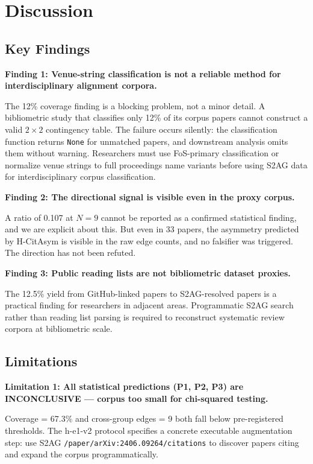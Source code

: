 \section{Discussion}
\label{sec:discussion}

\subsection{Key Findings}

\textbf{Finding 1: Venue-string classification is not a reliable method for interdisciplinary alignment corpora.}

The 12\% coverage finding is a blocking problem, not a minor detail.
A bibliometric study that classifies only 12\% of its corpus papers cannot construct a valid $2\times2$ contingency table.
The failure occurs silently: the classification function returns \texttt{None} for unmatched papers, and downstream analysis omits them without warning.
Researchers must use FoS-primary classification or normalize venue strings to full proceedings name variants before using S2AG data for interdisciplinary corpus classification.

\textbf{Finding 2: The directional signal is visible even in the proxy corpus.}

A ratio of 0.107 at $N=9$ cannot be reported as a confirmed statistical finding, and we are explicit about this.
But even in 33 papers, the asymmetry predicted by H-CitAsym is visible in the raw edge counts, and no falsifier was triggered.
The direction has not been refuted.

\textbf{Finding 3: Public reading lists are not bibliometric dataset proxies.}

The 12.5\% yield from GitHub-linked papers to S2AG-resolved papers is a practical finding for researchers in adjacent areas.
Programmatic S2AG search rather than reading list parsing is required to reconstruct systematic review corpora at bibliometric scale.

\subsection{Limitations}

\textbf{Limitation 1: All statistical predictions (P1, P2, P3) are INCONCLUSIVE --- corpus too small for chi-squared testing.}

Coverage = 67.3\% and cross-group edges = 9 both fall below pre-registered thresholds.
The h-e1-v2 protocol specifies a concrete executable augmentation step: use S2AG \texttt{/paper/arXiv:2406.09264/citations} to discover papers citing \citet{Shen2024Position} and expand the corpus programmatically.

